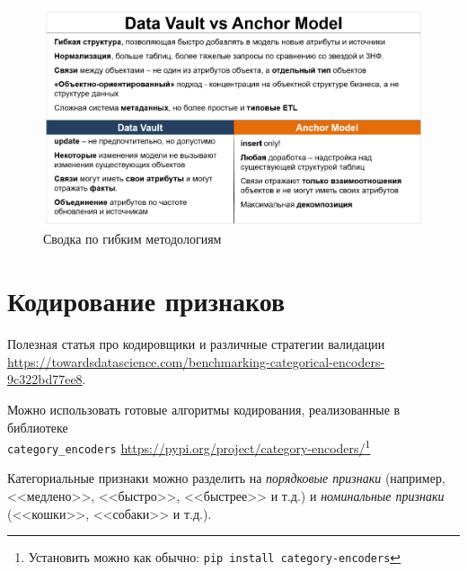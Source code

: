\documentclass[%
	11pt,
	a4paper,
	utf8,
		]{article}
\begin{document}
\begin{figure}[h]
	\centering
	\includegraphics[scale=0.65]{figures/vault_anchor.png}
	\caption{ Сводка по гибким методологиям }\label{fig:vault_anchor}
\end{figure}



\section{Кодирование признаков}

Полезная статья про кодировщики и различные стратегии валидации \url{https://towardsdatascience.com/benchmarking-categorical-encoders-9c322bd77ee8}.

Можно использовать готовые алгоритмы кодирования, реализованные в библиотеке\\ \texttt{category\_encoders} \url{https://pypi.org/project/category-encoders/}\footnote{Установить можно как обычно: \texttt{pip install category-encoders}}

Категориальные признаки можно разделить на \emph{порядковые признаки} (например, <<медлено>>, <<быстро>>, <<быстрее>> и т.д.) и \emph{номинальные признаки} (<<кошки>>, <<собаки>> и т.д.).
\end{document}
